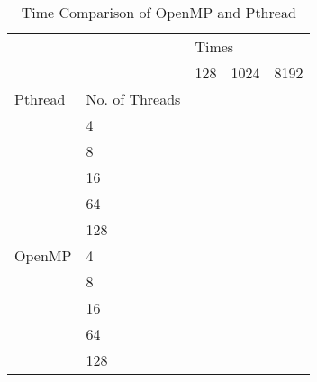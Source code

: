 \documentclass[journal, a4paper]{IEEEtran}
\begin{document}
\begin{table}[]
\centering
\caption{Time Comparison of OpenMP and Pthread}
\label{my-label}
\begin{tabular}{|l|l|l|l|l|}
\hline
\multicolumn{2}{|l|}{\multirow{2}{*}{}} & \multicolumn{3}{l|}{Times}                      \\ \cline{3-5} 
\multicolumn{2}{|l|}{}                  & 128 & 1024 & 8192 \\ \hline
Pthread            & No. of Threads  &               &                &                \\ \hline
\multirow{5}{*}{}  & 4                  &               &                &                \\ \cline{2-5} 
                   & 8                  &               &                &                \\ \cline{2-5} 
                   & 16                 &               &                &                \\ \cline{2-5} 
                   & 64                 &               &                &                \\ \cline{2-5} 
                   & 128                &               &                &                \\ \hline
OpenMP             & 4                  &               &                &                \\ \hline
\multirow{4}{*}{}  & 8                  &               &                &                \\ \cline{2-5} 
                   & 16                 &               &                &                \\ \cline{2-5} 
                   & 64                 &               &                &                \\ \cline{2-5} 
                   & 128                &               &                &                \\ \hline
\end{tabular}
\end{table}
	
	
\end{document}
